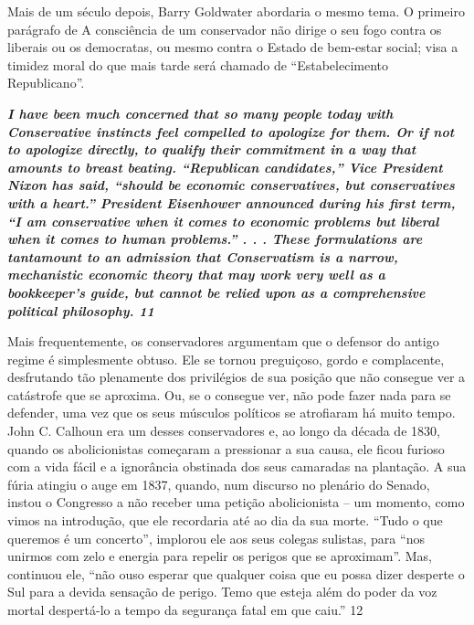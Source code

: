  
\par
 
Mais de um século depois, Barry Goldwater abordaria o mesmo tema. O primeiro parágrafo de A consciência de um conservador não dirige o seu fogo contra os liberais ou os democratas, ou mesmo contra o Estado de bem-estar social; visa a timidez moral do que mais tarde será chamado de “Estabelecimento Republicano”.
 
\par
 

 \textbf{\textit{I have been much concerned that so many people today with Conservative instincts feel compelled to apologize for them. Or if not to apologize directly, to qualify their commitment in a way that amounts to breast beating. “Republican candidates,” Vice President Nixon has said, “should be economic conservatives, but conservatives with a heart.” President Eisenhower announced during his first term, “I am conservative when it comes to economic problems but liberal when it comes to human problems.” . . . These formulations are tantamount to an admission that Conservatism is a narrow, mechanistic economic theory that may work very well as a bookkeeper’s guide, but cannot be relied upon as a comprehensive political philosophy. {{\color{blue} 11} } } }  
 
 
\par
 
Mais frequentemente, os conservadores argumentam que o defensor do antigo regime é simplesmente obtuso. Ele se tornou preguiçoso, gordo e complacente, desfrutando tão plenamente dos privilégios de sua posição que não consegue ver a catástrofe que se aproxima. Ou, se o consegue ver, não pode fazer nada para se defender, uma vez que os seus músculos políticos se atrofiaram há muito tempo. John C. Calhoun era um desses conservadores e, ao longo da década de 1830, quando os abolicionistas começaram a pressionar a sua causa, ele ficou furioso com a vida fácil e a ignorância obstinada dos seus camaradas na plantação. A sua fúria atingiu o auge em 1837, quando, num discurso no plenário do Senado, instou o Congresso a não receber uma petição abolicionista – um momento, como vimos na introdução, que ele recordaria até ao dia da sua morte. “Tudo o que queremos é um concerto”, implorou ele aos seus colegas sulistas, para “nos unirmos com zelo e energia para repelir os perigos que se aproximam”. Mas, continuou ele, “não ouso esperar que qualquer coisa que eu possa dizer desperte o Sul para a devida sensação de perigo. Temo que esteja além do poder da voz mortal despertá-lo a tempo da segurança fatal em que caiu.”
 {\color{blue} 12}  

